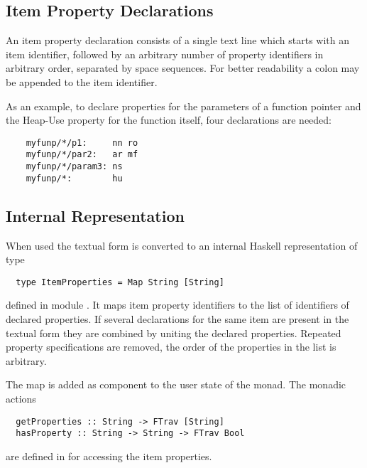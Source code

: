 \subsection{Item Property Declarations}
\label{impl-itemprops-decl}

An item property declaration consists of a single text line which starts with an item identifier, followed
by an arbitrary number of property identifiers in arbitrary order, separated by space sequences.
For better readability a colon may be appended to the item identifier.

As an example, to declare properties for the parameters  of a function pointer 
and the Heap-Use property for the function itself, four declarations are needed:
\begin{verbatim}
    myfunp/*/p1:     nn ro
    myfunp/*/par2:   ar mf
    myfunp/*/param3: ns
    myfunp/*:        hu
\end{verbatim}

\subsection{Internal Representation}
\label{impl-itemprops-internal}

When used the textual form is converted to an internal Haskell representation of type 
\begin{verbatim}
  type ItemProperties = Map String [String]
\end{verbatim}
defined in module . It maps item property identifiers to the list of identifiers of declared properties.
If several declarations for the same item are present in the textual form they are combined by uniting the 
declared properties. Repeated property specifications are removed, the order of the properties in the list is
arbitrary.

The  map is added as component to the user state of the  monad. The monadic actions
\begin{verbatim}
  getProperties :: String -> FTrav [String]
  hasProperty :: String -> String -> FTrav Bool
\end{verbatim}
are defined in  for accessing the item properties.
